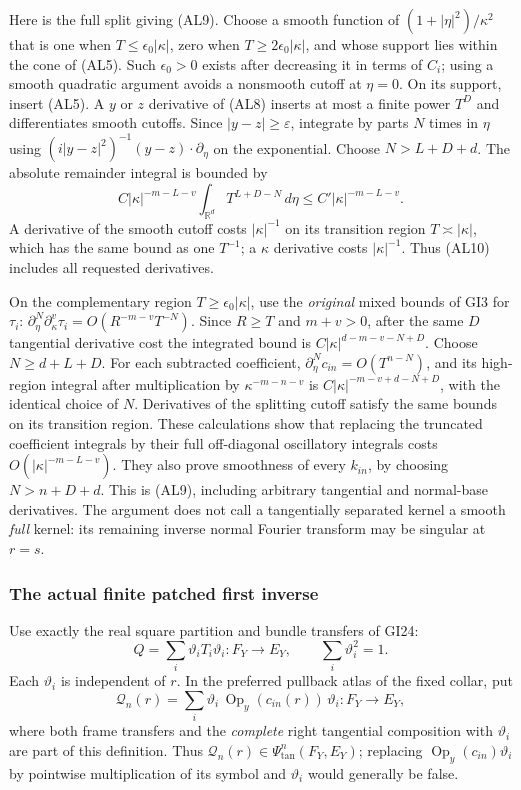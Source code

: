\documentclass[
  11pt,
]{article}
\begin{document}
Here is the full split giving (AL9). Choose a smooth function of
\((1+|\eta|^2)/\kappa^2\) that is one when \(T\leq\epsilon_0|\kappa|\),
zero when \(T\geq2\epsilon_0|\kappa|\), and whose support lies within
the cone of (AL5). Such \(\epsilon_0>0\) exists after decreasing it in
terms of \(C_i\); using a smooth quadratic argument avoids a nonsmooth
cutoff at \(\eta=0\). On its support, insert (AL5). A \(y\) or \(z\)
derivative of (AL8) inserts at most a finite power \(T^D\) and
differentiates smooth cutoffs. Since \(|y-z|\geq\varepsilon\), integrate
by parts \(N\) times in \(\eta\) using
\((i|y-z|^2)^{-1}(y-z)\cdot\partial_\eta\) on the exponential. Choose
\(N>L+D+d\). The absolute remainder integral is bounded by \[
 C|\kappa|^{-m-L-v}
 \int_{\mathbb R^d}T^{L+D-N}\,d\eta
 \leq C'|\kappa|^{-m-L-v}.
 \tag{AL10}
\] A derivative of the smooth cutoff costs \(|\kappa|^{-1}\) on its
transition region \(T\asymp|\kappa|\), which has the same bound as one
\(T^{-1}\); a \(\kappa\) derivative costs \(|\kappa|^{-1}\). Thus (AL10)
includes all requested derivatives.

On the complementary region \(T\geq\epsilon_0|\kappa|\), use the
\emph{original} mixed bounds of GI3 for \(\tau_i\):
\(\partial_\eta^N\partial_\kappa^v\tau_i=O(R^{-m-v}T^{-N})\). Since
\(R\geq T\) and \(m+v>0\), after the same \(D\) tangential derivative
cost the integrated bound is \(C|\kappa|^{d-m-v-N+D}\). Choose
\(N\geq d+L+D\). For each subtracted coefficient,
\(\partial_\eta^Nc_{in}=O(T^{n-N})\), and its high-region integral after
multiplication by \(\kappa^{-m-n-v}\) is \(C|\kappa|^{-m-v+d-N+D}\),
with the identical choice of \(N\). Derivatives of the splitting cutoff
satisfy the same bounds on its transition region. These calculations
show that replacing the truncated coefficient integrals by their full
off-diagonal oscillatory integrals costs \(O(|\kappa|^{-m-L-v})\). They
also prove smoothness of every \(k_{in}\), by choosing \(N>n+D+d\). This
is (AL9), including arbitrary tangential and normal-base derivatives.
The argument does not call a tangentially separated kernel a smooth
\emph{full} kernel: its remaining inverse normal Fourier transform may
be singular at \(r=s\).

\subsubsection{The actual finite patched first
inverse}\label{the-actual-finite-patched-first-inverse}

Use exactly the real square partition and bundle transfers of GI24: \[
 Q=\sum_i\vartheta_iT_i\vartheta_i:F_Y\longrightarrow E_Y,
 \qquad \sum_i\vartheta_i^2=1 .
 \tag{AL11}
\] Each \(\vartheta_i\) is independent of \(r\). In the preferred
pullback atlas of the fixed collar, put \[
 \mathcal Q_n(r)
 =\sum_i\vartheta_i\,\operatorname{Op}_y(c_{in}(r))\,\vartheta_i
 :F_Y\longrightarrow E_Y,
 \tag{AL12}
\] where both frame transfers and the \emph{complete} right tangential
composition with \(\vartheta_i\) are part of this definition. Thus
\(\mathcal Q_n(r)\in\Psi_{\mathrm{tan}}^n(F_Y,E_Y)\); replacing
\(\operatorname{Op}_y(c_{in})\vartheta_i\) by pointwise multiplication
of its symbol and \(\vartheta_i\) would generally be false.
\end{document}
